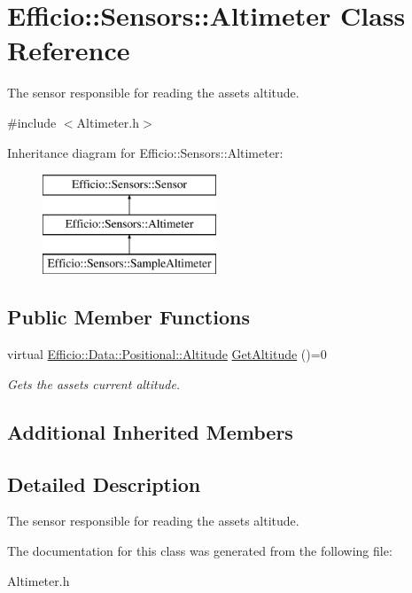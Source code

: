 \hypertarget{class_efficio_1_1_sensors_1_1_altimeter}{}\section{Efficio\+:\+:Sensors\+:\+:Altimeter Class Reference}
\label{class_efficio_1_1_sensors_1_1_altimeter}


The sensor responsible for reading the asset\textquotesingle{}s altitude.  




{\ttfamily \#include $<$Altimeter.\+h$>$}

Inheritance diagram for Efficio\+:\+:Sensors\+:\+:Altimeter\+:\begin{figure}[H]
\begin{center}
\leavevmode
\includegraphics[height=3.000000cm]{class_efficio_1_1_sensors_1_1_altimeter}
\end{center}
\end{figure}
\subsection*{Public Member Functions}
\begin{DoxyCompactItemize}
\item 
virtual \hyperlink{class_efficio_1_1_data_1_1_positional_1_1_altitude}{Efficio\+::\+Data\+::\+Positional\+::\+Altitude} \hyperlink{class_efficio_1_1_sensors_1_1_altimeter_a16f570153005d1225a442283bc970f8d}{Get\+Altitude} ()=0\hypertarget{class_efficio_1_1_sensors_1_1_altimeter_a16f570153005d1225a442283bc970f8d}{}\label{class_efficio_1_1_sensors_1_1_altimeter_a16f570153005d1225a442283bc970f8d}

\begin{DoxyCompactList}\small\item\em Gets the asset\textquotesingle{}s current altitude. \end{DoxyCompactList}\end{DoxyCompactItemize}
\subsection*{Additional Inherited Members}


\subsection{Detailed Description}
The sensor responsible for reading the asset\textquotesingle{}s altitude. 

The documentation for this class was generated from the following file\+:\begin{DoxyCompactItemize}
\item 
Altimeter.\+h\end{DoxyCompactItemize}
